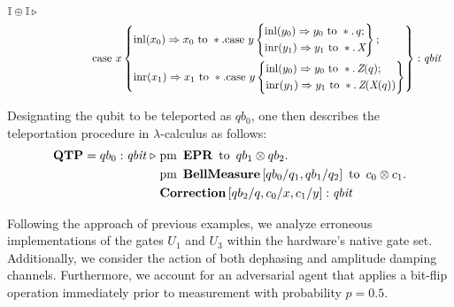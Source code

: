 \begin{example}
\begin{align*}
        \mathbb{I} \oplus \mathbb{I} \, \triangleright \\
    &\hspace{50pt} \text{case } x \left\{ 
        \begin{aligned} 
          & \mathrm{inl} (x_{0}) \Rightarrow x_0 \text{ to } \ast. \text{case } y \left\{
                \begin{aligned}
                  &\mathrm{inl} (y_{0})  \Rightarrow  y_0 \text{ to } \ast.
                        \, q; \\
                  &\mathrm{inr} (y_{1}) \Rightarrow y_1 \text{ to } \ast. \, \emph{X}
                \end{aligned} \right\}; \\
          & \mathrm{inr} (x_{1})  \Rightarrow x_1 \text{ to } \ast. \text{case } y \left\{
                \begin{aligned}
                  &  \mathrm{inl} (y_{0})  \Rightarrow
        y_0 \text{ to } \ast. \, \emph{Z}(q); \\
                  &\mathrm{inr} (y_{1}) \Rightarrow{} y_1 \text{ to } \ast. \, \emph{Z}
(\emph{X}(q))
                \end{aligned} \right\}
        \end{aligned}\right\} : \emph{qbit}
\end{align*}

Designating the qubit to be teleported as $qb_0$, one then describes the
teleportation procedure in $\lambda$-calculus as follows:
 \begin{align*}
  \textbf{QTP} = qb_{0}: \textit{qbit}\hspace{3 pt} \triangleright \hspace{3 pt} & \text{pm} \hspace{5pt} \textbf{EPR} \hspace{5pt} \text{to} \hspace{5pt}  qb_{1} \otimes qb_{2}.  \notag \\
     & \text{pm}\hspace{5pt} \textbf{BellMeasure}\, [qb_0/q_1,qb_{1}/q_2] \hspace{5pt}  \text{to} \hspace{5pt} c_{0}\otimes c_{1} . \notag \\
     & \textbf{Correction}\, [qb_{2}/q,c_{0}/x, c_{1}/y] 
     : \emph{qbit} 
 \end{align*}


 Following the approach of previous examples, we analyze erroneous implementations of the gates $U_1$ and $U_3$ within the hardware’s native gate set. Additionally, we consider the action of both dephasing and amplitude damping channels. Furthermore, we account for an adversarial agent that applies a bit-flip operation immediately prior to measurement with probability $ p = 0.5 $.  


\end{example}
